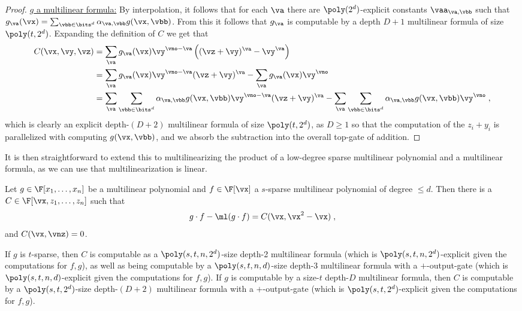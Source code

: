 \documentclass{toc}
\begin{document}
\begin{proof}
        \uline{$g$ a multilinear formula:} By interpolation, it follows that for each $\va$ there are $\poly(2^d)$-explicit constants $\vaa_{\va,\vbb}$ such that $g_\va(\vx)=\sum_{\vbb\in\bits^d} \alpha_{\va,\vbb}g(\vx,\vbb)$.  From this it follows that $g_\va$ is computable by a depth $D+1$ multilinear formula of size $\poly(t,2^d)$.  Expanding the definition of $C$ we get that
        \begin{align*}
                C(\vx,\vy,\vz)
                &=\sum_{\va} g_\va(\vx)\vy^{\vno-\va}\left((\vz+\vy)^\va-\vy^{\va}\right)\\
                &=\sum_{\va} g_\va(\vx)\vy^{\vno-\va}(\vz+\vy)^\va
                        -\sum_{\va} g_\va(\vx)\vy^\vno\\
                &=\sum_{\va} \sum_{\vbb\in\bits^d} \alpha_{\va,\vbb}g(\vx,\vbb)\vy^{\vno-\va}(\vz+\vy)^\va
                        -\sum_{\va} \sum_{\vbb\in\bits^d} \alpha_{\va,\vbb}g(\vx,\vbb)\vy^\vno
                \;,
        \end{align*}
        which is clearly an explicit
%
depth-$(D+2)$   %
multilinear formula of size $\poly(t,2^d)$, as $D\ge 1$ so that the computation of the $z_i+y_i$ is parallelized with computing $g(\vx,\vbb)$, and we absorb the subtraction into the overall top-gate of addition.
\end{proof}

%
%
It is then straightforward to  %
extend this to multilinearizing the product of a low-degree sparse multilinear polynomial and a multilinear formula, as we can use that multilinearization is linear.

\begin{corollarywp}\label{res:multilin:sparse_formula}
        Let $g\in\F[x_1,\ldots,x_n]$ be a multilinear polynomial and $f\in\F[\vx]$ a $s$-sparse multilinear polynomial of degree $\le d$. Then there is a $C\in\F[\vx,z_1,\ldots,z_n]$ such that
        \[
                g\cdot f-\ml(g\cdot f)
                =C(\vx,\vx^2-\vx)
                \;,
        \]
        and $C(\vx,\vnz)=0$.

        If $g$ is $t$-sparse, then $C$ is computable as a $\poly(s,t,n,2^d)$-size depth-2 multilinear formula (which is $\poly(s,t,n,2^d)$-explicit given the computations for $f,g$), as well as being computable by a $\poly(s,t,n,d)$-size depth-3 multilinear formula with a $+$-output-gate (which is $\poly(s,t,n,d)$-explicit given the computations for $f,g$).  If $g$ is computable by a size-$t$ depth-$D$ multilinear formula, then $C$ is computable by a $\poly(s,t,2^d)$-size depth-$(D+2)$ multilinear formula with a $+$-output-gate (which is $\poly(s,t,2^d)$-explicit given the computations for $f,g$).
\end{corollarywp}
\end{document}
